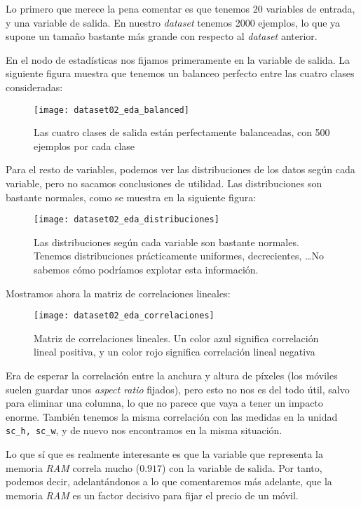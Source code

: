 \documentclass[11pt]{article}
\begin{document}
Lo primero que merece la pena comentar es que tenemos 20 variables de entrada, y una variable de salida. En nuestro \emph{dataset} tenemos 2000 ejemplos, lo que ya supone un tamaño bastante más grande con respecto al \emph{dataset} anterior.

En el nodo de estadísticas nos fijamos primeramente en la variable de salida. La siguiente figura muestra que tenemos un balanceo perfecto entre las cuatro clases consideradas:

\begin{figure}[H]
    \centering
    \texttt{[image: dataset02\_eda\_balanced]}
    \caption{Las cuatro clases de salida están perfectamente balanceadas, con 500 ejemplos por cada clase}
\end{figure}

Para el resto de variables, podemos ver las distribuciones de los datos según cada variable, pero no sacamos conclusiones de utilidad. Las distribuciones son bastante normales, como se muestra en la siguiente figura:

\begin{figure}[H]
    \centering
    \texttt{[image: dataset02\_eda\_distribuciones]}
    \caption{Las distribuciones según cada variable son bastante normales. Tenemos distribuciones prácticamente uniformes, decrecientes, \ldots No sabemos cómo podríamos explotar esta información.}
\end{figure}

Mostramos ahora la matriz de correlaciones lineales:

\begin{figure}[H]
    \centering
    \texttt{[image: dataset02\_eda\_correlaciones]}
    \caption{Matriz de correlaciones lineales. Un color azul significa correlación lineal positiva, y un color rojo significa correlación lineal negativa}
    \label{dataset02_eda_correlaciones:imagen}
\end{figure}

Era de esperar la correlación entre la anchura y altura de píxeles (los móviles suelen guardar unos \emph{aspect ratio} fijados), pero esto no nos es del todo útil, salvo para eliminar una columna, lo que no parece que vaya a tener un impacto enorme. También tenemos la misma correlación con las medidas en la unidad \lstinline{sc_h, sc_w}, y de nuevo nos encontramos en la misma situación.

Lo que sí que es realmente interesante es que la variable que representa la memoria \emph{RAM} correla mucho ($0.917$) con la variable de salida. Por tanto, podemos decir, adelantándonos a lo que comentaremos más adelante, que la memoria \emph{RAM} es un factor decisivo para fijar el precio de un móvil.
\end{document}
